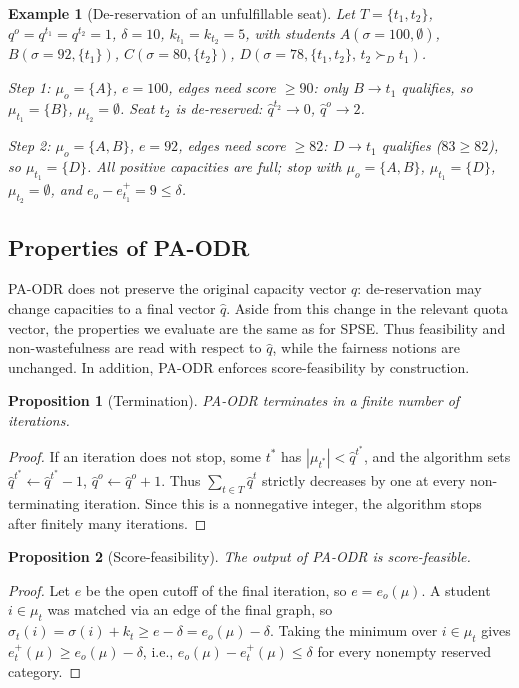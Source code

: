 \documentclass[10pt]{article}
\newtheorem{proposition}{Proposition}
\newtheorem{example}{Example}
\newcommand{\1}{\mathbf{1}}
\begin{document}
\begin{example}[De-reservation of an unfulfillable seat]
Let $T=\{t_1,t_2\}$, $q^o=q^{t_1}=q^{t_2}=1$, $\delta=10$, $k_{t_1}=k_{t_2}=5$, with students $A(\sigma=100,\emptyset)$, $B(\sigma=92,\{t_1\})$, $C(\sigma=80,\{t_2\})$, $D(\sigma=78,\{t_1,t_2\},\,t_2\succ_D t_1)$.

\emph{Step 1:} $\mu_o=\{A\}$, $e=100$, edges need score $\ge90$: only $B\to t_1$ qualifies, so $\mu_{t_1}=\{B\}$, $\mu_{t_2}=\emptyset$. Seat $t_2$ is de-reserved: $\hat q^{t_2}\to0$, $\hat q^o\to2$.

\emph{Step 2:} $\mu_o=\{A,B\}$, $e=92$, edges need score $\ge82$: $D\to t_1$ qualifies ($83\ge82$), so $\mu_{t_1}=\{D\}$. All positive capacities are full; stop with $\mu_o=\{A,B\}$, $\mu_{t_1}=\{D\}$, $\mu_{t_2}=\emptyset$, and $e_o-e_{t_1}^+=9\le\delta$.
\end{example}

\subsection{Properties of PA-ODR}

PA-ODR does not preserve the original capacity vector $q$: de-reservation may change capacities to a final vector $\hat q$. Aside from this change in the relevant quota vector, the properties we evaluate are the same as for SPSE. Thus feasibility and non-wastefulness are read with respect to $\hat q$, while the fairness notions are unchanged. In addition, PA-ODR enforces score-feasibility by construction.

\begin{proposition}[Termination]\label{prop:pa-odr-termination}
PA-ODR terminates in a finite number of iterations.
\end{proposition}
\begin{proof}
If an iteration does not stop, some $t^\ast$ has $|\mu_{t^\ast}|<\hat q^{t^\ast}$, and the algorithm sets $\hat q^{t^\ast}\gets\hat q^{t^\ast}-1$, $\hat q^o\gets\hat q^o+1$. Thus $\sum_{t\in T}\hat q^t$ strictly decreases by one at every non-terminating iteration. Since this is a nonnegative integer, the algorithm stops after finitely many iterations.
\end{proof}

\begin{proposition}[Score-feasibility]\label{prop:pa-odr-score-feasible}
The output of PA-ODR is score-feasible.
\end{proposition}
\begin{proof}
Let $e$ be the open cutoff of the final iteration, so $e=e_o(\mu)$. A student $i\in\mu_t$ was matched via an edge of the final graph, so $\sigma_t(i)=\sigma(i)+k_t\ge e-\delta=e_o(\mu)-\delta$. Taking the minimum over $i\in\mu_t$ gives $e_t^+(\mu)\ge e_o(\mu)-\delta$, i.e., $e_o(\mu)-e_t^+(\mu)\le\delta$ for every nonempty reserved category.
\end{proof}
\end{document}
